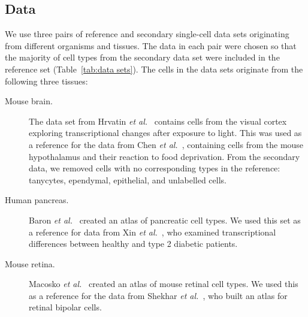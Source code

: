 \documentclass[runningheads]{llncs}
\newcommand{\etal}{\textit{et al.}}
\begin{document}
\subsection{Data}

We use three pairs of reference and secondary single-cell data sets originating
from different organisms and tissues. The data in each pair were chosen so that
the majority of cell types from the secondary data set were included in the
reference set (Table~\ref{tab:data sets}). The cells in the data sets
originate from the following three tissues:

\begin{description}
\item[Mouse brain.] The data set from Hrvatin \etal~\cite{hrvatin2018} contains
cells from the visual cortex exploring transcriptional changes after exposure
to light. This was used as a reference for the data from Chen
\etal~\cite{chen2017}, containing cells from the mouse hypothalamus and
their reaction to food deprivation. From the secondary data, we removed cells
with no corresponding types in the reference: tanycytes, ependymal,
epithelial, and unlabelled cells.

\item[Human pancreas.] Baron \etal~\cite{baron2016} created
an atlas of pancreatic cell types. We used this set as a reference
for data from Xin \etal~\cite{xin2016}, who examined transcriptional
differences between healthy and type 2 diabetic patients.

\item[Mouse retina.] Macosko \etal~\cite{macosko2015} created
an atlas of mouse retinal cell types. We used this as a reference
for the data from Shekhar \etal~\cite{shekhar2016}, who built an atlas for
retinal bipolar cells.
\end{description}
\end{document}
